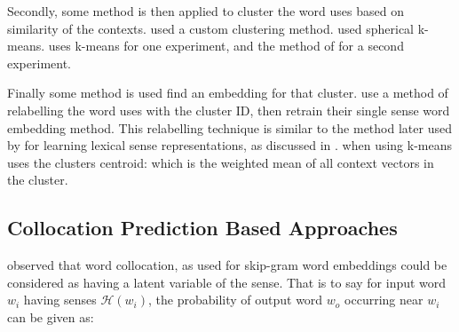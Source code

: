 \documentclass[12pt,parskip]{komatufte}
\begin{document}
Secondly, some method is then applied to cluster the word uses based on similarity of the contexts.
\textcite{pantel2002WSI} used a custom clustering method.
\textcite{Huang2012} used spherical k-means.
\textcite{kaageback2015neural} uses k-means for one experiment, and the method of \textcite{neelakantan2015efficient} for a second experiment.

Finally some method is used find an embedding for that cluster.
\textcite{Huang2012} use a method of relabelling the word uses with the cluster ID,
then retrain their single sense word embedding method.
This relabelling technique is similar to the method later used by \textcite{Chen2014} for learning lexical sense representations, as discussed in .
\textcite{kaageback2015neural} when using k-means uses the clusters centroid: which is the weighted mean of all context vectors in the cluster.



\subsection{Collocation Prediction Based Approaches}


 observed that word collocation, as used for skip-gram word embeddings could be considered as having a latent variable of the sense.
That is to say for input word $w_i$ having senses $\mathcal{H}(w_i)$,
the probability of output word $w_o$ occurring near $w_i$ can be given as:
\end{document}
